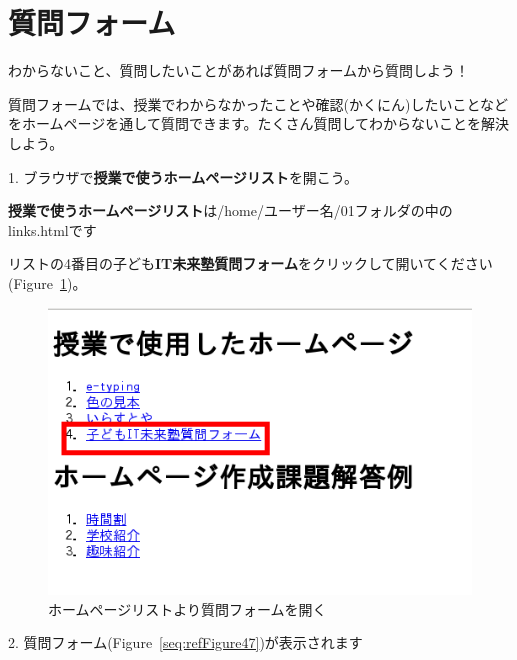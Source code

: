 \clearpage
\section{質問フォーム}

わからないこと、質問したいことがあれば質問フォームから質問しよう！

質問フォームでは、授業でわからなかったことや確認(かくにん)したいことなどをホームページを通して質問できます。たくさん質問してわからないことを解決しよう。

1.
ブラウザで\textbf{授業で使うホームページリスト}を開こう。

\textbf{授業で使うホームページリスト}は/home/ユーザー名/01フォルダの中のlinks.htmlです

リストの4番目の子ども\textbf{IT未来塾質問フォーム}をクリックして開いてください(Figure~\ref{seq:refFigure46})。


\begin{figure}[H]
    \begin{center}
        \includegraphics[width=11.231cm,height=7.613cm]{text02-img/textbook-img245.png}
        \caption{ホームページリストより質問フォームを開く}
        \label{seq:refFigure46}
    \end{center}
\end{figure}

2.
質問フォーム(Figure~\ref{seq:refFigure47})が表示されます

